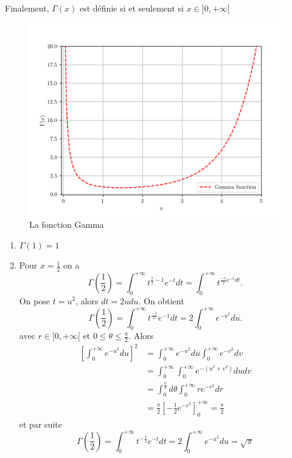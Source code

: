Finalement, $\Gamma(x) $ est définie si et seulement si $x \in ]0,+\infty[$
\begin{figure}[H]
    \centering
    \includegraphics[scale = 0.7]{IMAGES/gamma_func.png}
    \caption{La fonction Gamma}
    \label{fig:gamma_fact}
\end{figure}
\begin{exemple}
    \begin{enumerate}
        \item $\Gamma(1) = 1$
        \item Pour $x=\frac{1}{2}$ on a 
        \begin{equation*}
            \Gamma(\frac{1}{2}) = \int_{0}^{+\infty} t^{\frac{1}{2}-1} e^{-t} dt = \int_{0}^{+\infty} t^{\frac{-1}{2} e^{-t} dt}.
        \end{equation*}
        On pose $ t = u ^ 2 $, alors $dt = 2udu$. On obtient
        \begin{equation*}
            \Gamma(\frac{1}{2}) = \int_{0}^{+\infty} t^{\frac{-1}{2}} e^{-1}dt = 2\int_{0}^{+\infty} e^{-u^2} du.
        \end{equation*}
        avec $r \in [0, +\infty[$  et $ 0  \leq \theta \leq \frac{\pi}{2}$. Alors
        \begin{align*}
            \left[\int_{0}^{+\infty} e^{{-u^2}} du\right]^2 &= \int_{0}^{+\infty} e^{-u^2} du\int_{0}^{+\infty} e^{-v^2} dv
            \\
            &= \int_{0}^{+\infty}\int_0^{+\infty} e^{-(u^2+v^2)} dudv\\ 
            &= \int_{0}^{\frac{\pi}{2}}d\theta \int_{0}^{+\infty} r e^{-r^2} dr\\
            &= \frac{\pi}{2}\left[ -\frac{1}{2} e^{-r^2}\right]_0^{+\infty} = \frac{\pi}{2}
        \end{align*}
        et par suite 
        \begin{equation*}
            \Gamma(\frac{1}{2})=\int_0^{+\infty} t^{-\frac{1}{2}} e^{-t} dt = 2\int_0^{+\infty} e^{-u^2} du = \sqrt{\pi}
        \end{equation*}
    \end{enumerate}
\end{exemple}
